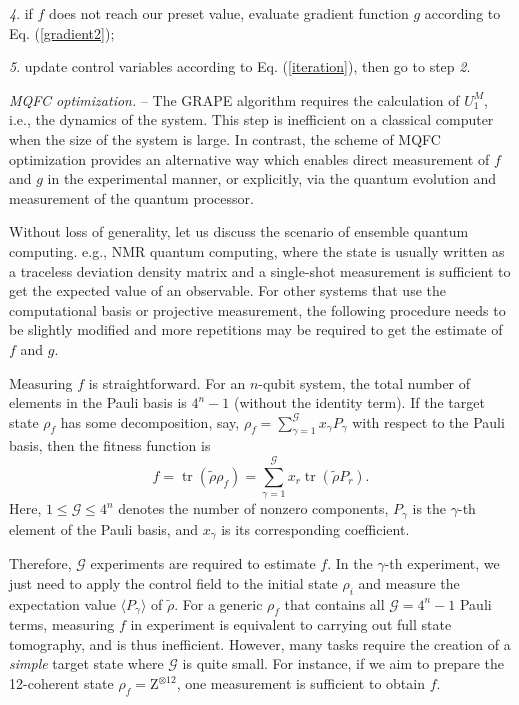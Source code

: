 \documentclass[twocolumn,reprint, amsmath,amssymb,showpacs,superscriptaddress]{revtex4-1}
\begin{document}
\emph{4}. if $f$ does not reach our preset value, evaluate gradient function $g$ according to Eq. (\ref{gradient2});

\emph{5}. update control variables according to Eq. (\ref{iteration}), then go to step \emph{2}.

\emph{MQFC optimization.} -- The GRAPE algorithm requires the calculation of $U_{1}^{M}$, i.e., the dynamics of the system. This step is inefficient on a classical computer when the size of the system is large. In contrast, the scheme of MQFC  optimization provides an alternative way which enables direct measurement of $f$ and $g$ in the experimental manner, or explicitly, via the quantum evolution and measurement of the quantum processor.

Without loss of generality, let us discuss the scenario of ensemble quantum computing. e.g., NMR quantum computing, where the state is usually written as a traceless deviation density matrix and a single-shot measurement is sufficient to get the expected value of an observable. For other systems that use the computational basis or projective measurement, the following procedure needs to be slightly modified and more repetitions may be required to get the estimate of $f$ and $g$.

Measuring $f$ is straightforward. For an $n$-qubit system, the total number of elements in the Pauli basis is $4^n-1$ (without the identity term). If the target state $\rho_f$ has some decomposition, say, $\rho_f = \sum_{\gamma=1}^{\mathcal{G}} x_\gamma P_\gamma$ with respect to the Pauli basis, then the fitness function is
\begin{equation}
f = \operatorname{tr}\left( \tilde \rho  {\rho _f} \right)  = \sum\limits_{\gamma=1}^{\mathcal{G}} {{x_r}\operatorname{tr}\left( {\tilde\rho  {P_r}} \right)}. \label{f}
\end{equation}
Here, $1\leq \mathcal{G}\leq 4^n$ denotes the number of nonzero components, $P_\gamma$ is the $\gamma$-th element of the Pauli basis, and $x_\gamma$ is its corresponding coefficient.

 Therefore, $\mathcal{G}$ experiments are required to estimate $f$.  In the $\gamma$-th experiment, we just need to apply the control field to the initial state $\rho_i$ and measure the expectation value $\langle P_\gamma \rangle$ of $\tilde \rho$.  For a generic $\rho_f$ that contains all $\mathcal{G} = 4^n-1$ Pauli terms, measuring $f$ in experiment is equivalent to carrying out full state tomography, and is thus inefficient. However, many tasks require the creation of a \emph{simple} target state where $\mathcal{G}$ is quite small. For instance, if we aim to prepare the 12-coherent state $\rho_f = \text{Z}^{\otimes 12}$, one measurement is sufficient to obtain $f$.
\end{document}
